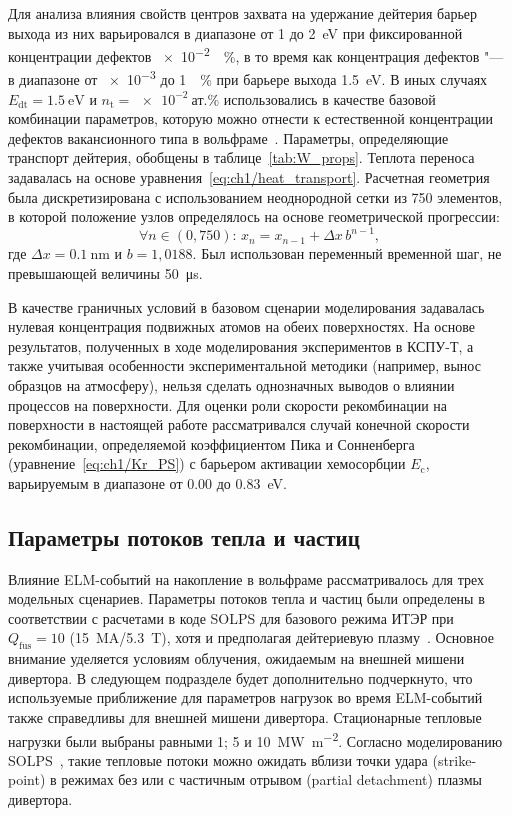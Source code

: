 Для анализа влияния свойств центров захвата на удержание дейтерия барьер выхода из них варьировался в диапазоне от \num{1} до \SI{2}{\electronvolt} при фиксированной концентрации дефектов \SI{e-2}{\percent}, в то время как концентрация дефектов "--- в диапазоне от \num{e-3} до \SI{1}{\percent} при барьере выхода \SI{1.5}{\electronvolt}. В иных случаях $E_{\mathrm{dt}}=\SI{1.5}{\electronvolt}$ и $n_{\mathrm{t}}=\SI{e-2}{\text{ат.}\percent}$ использовались в качестве базовой комбинации параметров, которую можно отнести к естественной концентрации дефектов вакансионного типа в вольфраме~\cite{DeTemmerman2018}. Параметры, определяющие транспорт дейтерия, обобщены в таблице~\cref{tab:W_props}. Теплота переноса задавалась на основе уравнения~\cref{eq:ch1/heat_transport}. Расчетная геометрия была дискретизирована с использованием неоднородной сетки из 750 элементов, в которой положение узлов определялось на основе геометрической прогрессии:
\[
	\forall n\in(0,750):\,x_{n}=x_{n-1}+\Delta x\,b^{n-1},
\]
где $\Delta x=\SI{0.1}{\nano\meter}$ и $b=1,0188$. Был использован переменный временной шаг, не превышающей величины \SI{50}{\micro\second}.

В качестве граничных условий в базовом сценарии моделирования задавалась нулевая концентрация подвижных атомов на обеих поверхностях. На основе результатов, полученных в ходе моделирования экспериментов в КСПУ-Т, а также учитывая особенности экспериментальной методики (например, вынос образцов на атмосферу), нельзя сделать однозначных выводов о влиянии процессов на поверхности. Для оценки роли скорости рекомбинации на поверхности в настоящей работе рассматривался случай конечной скорости рекомбинации, определяемой коэффициентом Пика и Сонненберга (уравнение~\cref{eq:ch1/Kr_PS}) с барьером активации хемосорбции \( E_\mathrm{c} \), варьируемым в диапазоне от \num{0.00} до \SI{0.83}{\electronvolt}.

\subsection{Параметры потоков тепла и частиц}
Влияние ELM-событий на накопление в вольфраме рассматривалось для трех модельных сценариев. Параметры потоков тепла и частиц были определены в соответствии с расчетами в коде SOLPS для базового режима ИТЭР при $Q_\mathrm{fus}=\num{10}$ (\SI{15}{\mega\ampere}/\SI{5.3}{\tesla}), хотя и предполагая дейтериевую плазму~\cite{Pitts2019, Orrico2023}. Основное внимание уделяется условиям облучения, ожидаемым на внешней мишени дивертора. В следующем подразделе будет дополнительно подчеркнуто, что используемые приближение для параметров нагрузок во время ELM-событий также справедливы для внешней мишени дивертора. Стационарные тепловые нагрузки были выбраны равными 1; 5 и \SI{10}{\mega\watt\per\meter\squared}. Согласно моделированию SOLPS~\cite{Pitts2019, Orrico2023}, такие тепловые потоки можно ожидать вблизи точки удара (strike-point) в режимах без или с частичным отрывом (partial detachment) плазмы дивертора.

